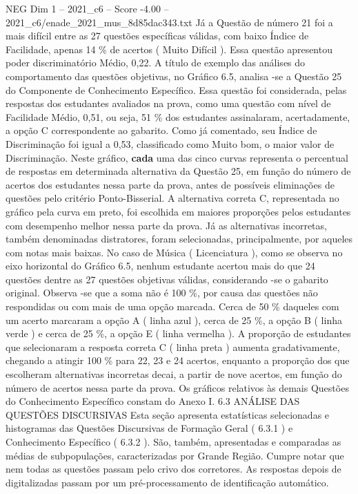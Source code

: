 \begin{textsample}{NEG Dim 1 – 2021\_c6 – Score -4.00 – 2021\_c6/enade\_2021\_mus\_8d85dac343.txt}
Já a Questão de número 21 foi a mais difícil entre as 27 questões específicas válidas, com baixo Índice de Facilidade, apenas 14 \% de acertos ( Muito Difícil ).
Essa questão apresentou poder discriminatório Médio, 0,22.
A título de exemplo das análises do comportamento das questões objetivas, no Gráfico 6.5, analisa -se a Questão 25 do Componente de Conhecimento Específico.
Essa questão foi considerada, pelas respostas dos estudantes avaliados na prova, como uma questão com nível de Facilidade Médio, 0,51, ou seja, 51 \% dos estudantes assinalaram, acertadamente, a opção C correspondente ao gabarito.
Como já comentado, seu Índice de Discriminação foi igual a 0,53, classificado como Muito bom, o maior valor de Discriminação.
Neste gráfico, \textbf{cada} uma das cinco curvas representa o percentual de respostas em determinada alternativa da Questão 25, em função do número de acertos dos estudantes nessa parte da prova, antes de possíveis eliminações de questões pelo critério Ponto-Bisserial.
A alternativa correta C, representada no gráfico pela curva em preto, foi escolhida em maiores proporções pelos estudantes com desempenho melhor nessa parte da prova.
Já as alternativas incorretas, também denominadas distratores, foram selecionadas, principalmente, por aqueles com notas mais baixas.
No caso de Música ( Licenciatura ), como se observa no eixo horizontal do Gráfico 6.5, nenhum estudante acertou mais do que 24 questões dentre as 27 questões objetivas válidas, considerando -se o gabarito original.
Observa -se que a soma não é 100 \%, por causa das questões não respondidas ou com mais de uma opção marcada.
Cerca de 50 \% daqueles com um acerto marcaram a opção A ( linha azul ), cerca de 25 \%, a opção B ( linha verde ) e cerca de 25 \%, a opção E ( linha vermelha ).
A proporção de estudantes que selecionaram a resposta correta C ( linha preta ) aumenta gradativamente, chegando a atingir 100 \% para 22, 23 e 24 acertos, enquanto a proporção dos que escolheram alternativas incorretas decai, a partir de nove acertos, em função do número de acertos nessa parte da prova.
Os gráficos relativos às demais Questões do Conhecimento Específico constam do Anexo I. 6.3 ANÁLISE DAS QUESTÕES DISCURSIVAS Esta seção apresenta estatísticas selecionadas e histogramas das Questões Discursivas de Formação Geral ( 6.3.1 ) e Conhecimento Específico ( 6.3.2 ).
São, também, apresentadas e comparadas as médias de subpopulações, caracterizadas por Grande Região.
Cumpre notar que nem todas as questões passam pelo crivo dos corretores.
As respostas depois de digitalizadas passam por um pré-processamento de identificação automático.

\end{textsample}
